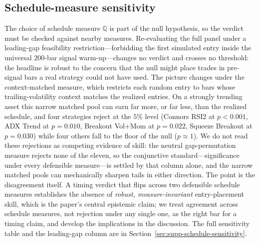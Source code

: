 \subsection{Schedule-measure sensitivity}
\label{sec:schedule-sensitivity}

The choice of schedule measure $\mathbb{Q}$ is part of the null hypothesis, so the verdict must be checked against nearby measures. Re-evaluating the full panel under a leading-gap feasibility restriction---forbidding the first simulated entry inside the universal $200$-bar signal warm-up---changes no verdict and crosses no threshold: the headline is robust to the concern that the null might place trades in pre-signal bars a real strategy could not have used. The picture changes under the context-matched measure, which restricts each random entry to bars whose trailing-volatility context matches the realized entries. On a strongly trending asset this narrow matched pool can earn far more, or far less, than the realized schedule, and four strategies reject at the $5\%$ level (Connors RSI2 at $p<0.001$, ADX Trend at $p=0.010$, Breakout Vol+Mom at $p=0.022$, Squeeze Breakout at $p=0.030$) while four others fall to the floor of the null ($p\approx1$). We do not read these rejections as competing evidence of skill: the neutral gap-permutation measure rejects none of the eleven, so the conjunctive standard---significance under every defensible measure---is settled by that column alone, and the narrow matched pools can mechanically sharpen tails in either direction. The point is the disagreement itself. A timing verdict that flips across two defensible schedule measures establishes the absence of \emph{robust, measure-invariant} entry-placement skill, which is the paper's central epistemic claim; we treat agreement across schedule measures, not rejection under any single one, as the right bar for a timing claim, and develop the implications in the discussion. The full sensitivity table and the leading-gap column are in Section~\ref{sec:supp-schedule-sensitivity}.

